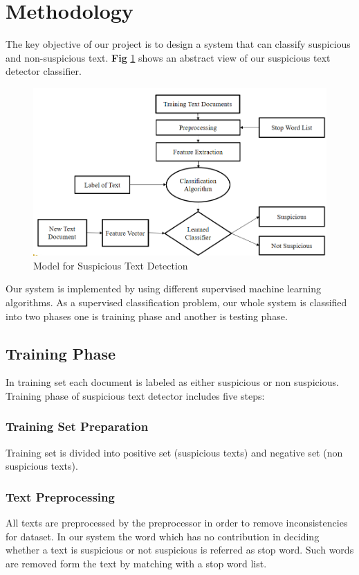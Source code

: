 \section{Methodology}
The key objective of our project is to design a system that can classify suspicious and non-suspicious text. \textbf{Fig} \ref{fig:proposed_model} shows an abstract view of our suspicious text detector classifier.

\begin{figure}[h!]
\centering
  \includegraphics[scale=0.365]{Figures/proposed_model.PNG}
  \caption{ Model for Suspicious Text Detection}
  \label{fig:proposed_model}
\end{figure}

Our system is implemented by using different supervised machine learning algorithms. As a supervised classification problem, our whole system is classified into two phases one is training phase and another is testing phase.
\subsection{\textbf {Training Phase}}
In training set each document is labeled as either suspicious or non suspicious. Training phase of suspicious text detector includes five steps:
\subsubsection{\textbf{Training Set Preparation}}
Training set is divided into positive set (suspicious texts) and negative set (non suspicious texts).
\subsubsection{\textbf{Text Preprocessing}}
All texts are preprocessed by the preprocessor in order to remove inconsistencies for dataset. In our system the word which has no contribution in deciding whether a text is suspicious or not suspicious is referred as stop word. Such words are removed form the text by matching with a stop word list. 
